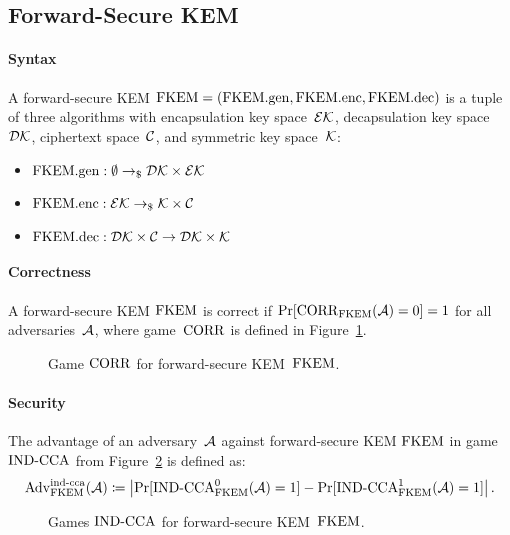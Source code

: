 \documentclass[a4paper,orivec]{llncs}
\begin{document}
\subsection{Forward-Secure KEM}

\paragraph{Syntax}
A forward-secure KEM $\mathrm{FKEM}=(\mathrm{FKEM}.\mathrm{gen},\mathrm{FKEM}.\mathrm{enc},\mathrm{FKEM}.\mathrm{dec})$ is a tuple of three algorithms with encapsulation key space~$\mathcal{EK}$, decapsulation key space~$\mathcal{DK}$, ciphertext space~$\mathcal{C}$, and symmetric key space~$\mathcal{K}$:

\begin{itemize}
    \item $\mathrm{FKEM}.\mathrm{gen}: \emptyset \to_\$ \mathcal{DK}\times\mathcal{EK}$
    \item $\mathrm{FKEM}.\mathrm{enc}: \mathcal{EK} \to_\$ \mathcal{K}\times\mathcal{C}$
    \item $\mathrm{FKEM}.\mathrm{dec}: \mathcal{DK}\times\mathcal{C} \to \mathcal{DK}\times\mathcal{K}$
\end{itemize}

\paragraph{Correctness}
A forward-secure KEM $\mathrm{FKEM}$ is correct if $\Pr[\mathrm{CORR}_{\mathrm{FKEM}}(\mathcal{A})=0]=1$ for all adversaries~$\mathcal{A}$, where game~$\mathrm{CORR}$ is defined in Figure~\ref{fig:fkem:corr}.

\begin{figure}[!ht]
    \centering
    \nicoresetlinenr%
    \fbox{%
        \scalebox{\codescalefactor}{%
        }%
    }
    \caption{%
        Game $\mathrm{CORR}$ for forward-secure KEM~$\mathrm{FKEM}$.
    }
    \label{fig:fkem:corr}
\end{figure}

\paragraph{Security}
The advantage of an adversary~$\mathcal{A}$ against forward-secure KEM $\mathrm{FKEM}$ in game ${\mathrm{IND}\text{-}\mathrm{CCA}}$ from Figure~\ref{fig:fkem:ind} is defined as:
\[
\mathrm{Adv}_{\mathrm{FKEM}}^{\mathrm{ind}\text{-}\mathrm{cca}}(\mathcal{A})\coloneqq\left|\Pr[{\mathrm{IND}\text{-}\mathrm{CCA}}_{\mathrm{FKEM}}^0(\mathcal{A})=1]-\Pr[{\mathrm{IND}\text{-}\mathrm{CCA}}_{\mathrm{FKEM}}^1(\mathcal{A})=1]\right|\text{.}
\]

\begin{figure}[!ht]
    \centering
    \nicoresetlinenr%
    \fbox{%
        \scalebox{\codescalefactor}{%
        }%
    }
    \caption{%
        Games ${\mathrm{IND}\text{-}\mathrm{CCA}}$ for forward-secure KEM~$\mathrm{FKEM}$.
    }
    \label{fig:fkem:ind}
\end{figure}
\end{document}
